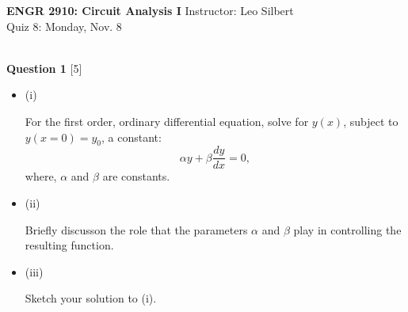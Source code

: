 \documentclass[12pt]{article}
\newcommand{\bit}{\begin{itemize}}
\newcommand{\eit}{\end{itemize}}
\begin{document}

\begin{center}
\hfil
{\large\bf {ENGR 2910: Circuit Analysis I}}
\hfill Instructor: Leo Silbert \\
Quiz 8: Monday, Nov. 8\\
\hrulefill\\
\end{center}




\noindent
\noindent
{\bf Question 1} [5]

\bit 

\item[(i)]

For the first order, ordinary differential equation, solve for $y(x)$,  
subject to $y(x=0) = y_{0}$, a constant:  
\[
\alpha y + \beta \frac{d y}{d x} = 0,
\] 
where, $\alpha$ and $\beta$ are constants. 

\vspace{3.5in}
\item[(ii)]

Briefly discusson the role that the parameters $\alpha$ and $\beta$ play in controlling the resulting function.

\vspace{1in}
\item[(iii)]

Sketch your solution to (i).

\eit
\end{document}
